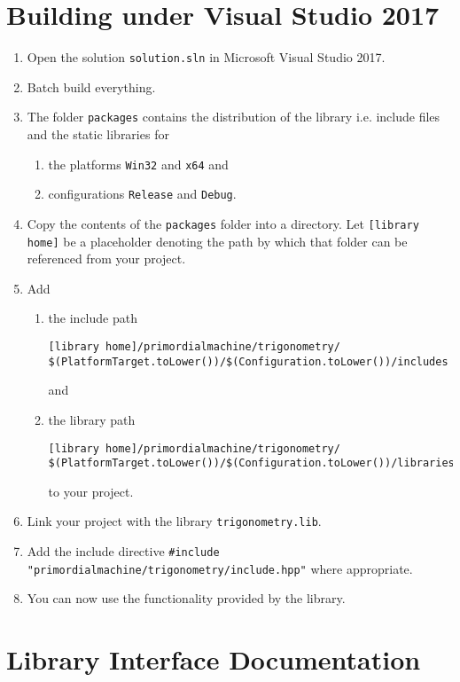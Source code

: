 \documentclass[oneside]{report}
\begin{document}
\chapter{Building under Visual Studio 2017}
\begin{enumerate}
\item Open the solution \texttt{solution.sln} in Microsoft Visual Studio 2017.
\item Batch build everything.
\item The folder \texttt{packages} contains the distribution of the library i.e. include files and the
      static libraries for
  \begin{enumerate}
    \item the platforms \texttt{Win32} and \texttt{x64} and
    \item configurations \texttt{Release} and \texttt{Debug}.
  \end{enumerate}
\item Copy the contents of the \verb+packages+ folder into a directory. Let
      \verb+[library home]+ be a placeholder denoting the path by which that folder
      can be referenced from your project.
\item Add
  \begin{enumerate}
    \item the include path
\begin{verbatim}
[library home]/primordialmachine/trigonometry/
$(PlatformTarget.toLower())/$(Configuration.toLower())/includes
\end{verbatim}
	and
    \item the library path
\begin{verbatim}
[library home]/primordialmachine/trigonometry/
$(PlatformTarget.toLower())/$(Configuration.toLower())/libraries
\end{verbatim}
    to your project.
\end{enumerate}
\item Link your project with the library \verb+trigonometry.lib+.
\item Add the include directive \verb+#include "primordialmachine/trigonometry/include.hpp"+ where appropriate.
\item You can now use the functionality provided by the library.
\end{enumerate}

\chapter{Library Interface Documentation}
\end{document}
